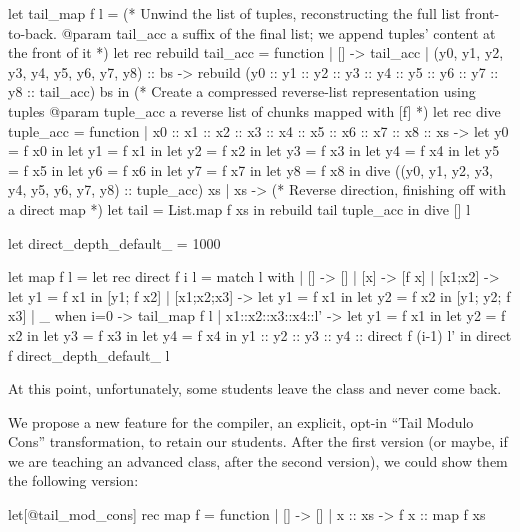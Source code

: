 \begin{minipage}{0.6\linewidth}
\begin{Ocaml}[basicstyle=\ttfamily\tiny]
let tail_map f l =
  (* Unwind the list of tuples, reconstructing the full list front-to-back.
     @param tail_acc a suffix of the final list; we append tuples' content
     at the front of it *)
  let rec rebuild tail_acc = function
    | [] -> tail_acc
    | (y0, y1, y2, y3, y4, y5, y6, y7, y8) :: bs ->
      rebuild (y0 :: y1 :: y2 :: y3 :: y4 :: y5 :: y6 :: y7 :: y8 :: tail_acc) bs
  in
  (* Create a compressed reverse-list representation using tuples
     @param tuple_acc a reverse list of chunks mapped with [f] *)
  let rec dive tuple_acc = function
    | x0 :: x1 :: x2 :: x3 :: x4 :: x5 :: x6 :: x7 :: x8 :: xs ->
      let y0 = f x0 in let y1 = f x1 in let y2 = f x2 in
      let y3 = f x3 in let y4 = f x4 in let y5 = f x5 in
      let y6 = f x6 in let y7 = f x7 in let y8 = f x8 in
      dive ((y0, y1, y2, y3, y4, y5, y6, y7, y8) :: tuple_acc) xs
    | xs ->
      (* Reverse direction, finishing off with a direct map *)
      let tail = List.map f xs in
      rebuild tail tuple_acc
  in
  dive [] l
\end{Ocaml}
\end{minipage}
\hfill
\begin{minipage}{0.4\linewidth}
\begin{Ocaml}[basicstyle=\ttfamily\tiny]
let direct_depth_default_ = 1000

let map f l =
  let rec direct f i l = match l with
    | [] -> []
    | [x] -> [f x]
    | [x1;x2] -> let y1 = f x1 in [y1; f x2]
    | [x1;x2;x3] ->
      let y1 = f x1 in let y2 = f x2 in [y1; y2; f x3]
    | _ when i=0 -> tail_map f l
    | x1::x2::x3::x4::l' ->
      let y1 = f x1 in
      let y2 = f x2 in
      let y3 = f x3 in
      let y4 = f x4 in
      y1 :: y2 :: y3 :: y4 :: direct f (i-1) l'
  in
  direct f direct_depth_default_ l
\end{Ocaml}
\end{minipage}
\lstset{basicstyle=\small\ttfamily}

At this point, unfortunately, some students leave the class and never
come back.

We propose a new feature for the \OCaml compiler, an explicit, opt-in
``Tail Modulo Cons'' transformation, to retain our students. After the
first version (or maybe, if we are teaching an advanced class, after
the second version), we could show them the following version:
\begin{Ocaml}
let[@tail_mod_cons] rec map f = function
| [] -> []
| x :: xs -> f x :: map f xs
\end{Ocaml}

